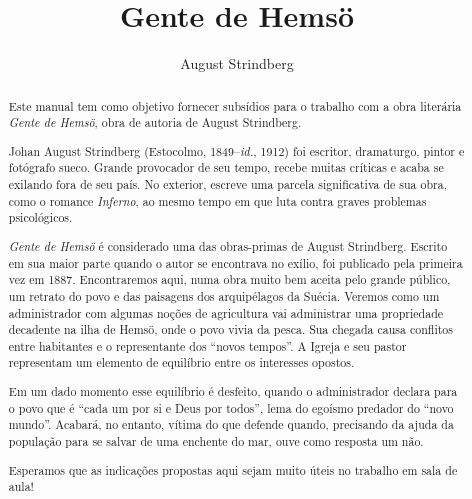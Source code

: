 \documentclass[12pt]{extarticle}
\begin{document}

\newcommand{\AutorLivro}{August Strindberg}
\newcommand{\TituloLivro}{Gente de Hemsö}
\newcommand{\Tema}{Ficção, mistério e fantasia}
\newcommand{\Genero}{Romance}
\newcommand{\imagemCapa}{./images/PNLD0039-01.png}
\newcommand{\issnppub}{978-65-89810-08-7}
\newcommand{\issnepub}{978-65-89810-04-9}
\newcommand{\colaborador}{Bruno Gradella e Vicente Castro} 


\title{\TituloLivro}
\author{\AutorLivro}
\def\authornotes{\colaborador}

\date{}
\maketitle

\baselineskip\par

\begin{abstract}
Este manual tem como objetivo fornecer subsídios para o trabalho com a
obra literária \emph{Gente de Hemsö}, obra de autoria de August
Strindberg.

Johan August Strindberg (Estocolmo, 1849--\textit{id.}, 1912) 
foi escritor, dramaturgo, pintor e fotógrafo sueco. Grande provocador
de seu tempo, recebe muitas críticas e acaba se exilando fora de 
seu país. No exterior, escreve uma parcela significativa de sua obra,
como o romance \textit{Inferno}, ao mesmo tempo em que luta contra graves 
problemas psicológicos.

\textit{Gente de Hemsö} é considerado uma das obras-primas de August 
Strindberg. Escrito em sua maior parte quando o autor se encontrava no 
exílio, foi publicado pela primeira vez em 1887. Encontraremos aqui, 
numa obra muito bem aceita pelo grande público, um retrato do povo e das 
paisagens dos arquipélagos da Suécia. Veremos como um administrador com 
algumas noções de agricultura vai administrar uma propriedade decadente 
na ilha de Hemsö, onde o povo vivia da pesca. Sua chegada causa 
conflitos entre habitantes e o representante dos ``novos tempos''. A Igreja 
e seu pastor representam um elemento de equilíbrio entre os interesses 
opostos.

Em um dado momento esse equilíbrio é desfeito, quando o administrador 
declara para o povo que é ``cada um por si e Deus por todos'', lema do 
egoísmo predador do ``novo mundo''. Acabará, no entanto, vítima do que 
defende quando, precisando da ajuda da população para se salvar de uma 
enchente do mar, ouve como resposta um não.

Esperamos que as indicações propostas aqui sejam muito úteis no trabalho 
em sala de aula! 
\end{abstract}
\pagebreak
\end{document}
